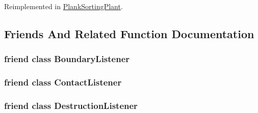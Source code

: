 Reimplemented in \hyperlink{classPlankSortingPlant_a512555c258c6e6d824356af6ed2e77f2}{Plank\-Sorting\-Plant}.



\subsection{Friends And Related Function Documentation}
\hypertarget{classSimulatorPage_ace42de2cf55b34c2abc668b911b4fc70}{
\subsubsection[{Boundary\-Listener}]{\setlength{\rightskip}{0pt plus 5cm}friend class Boundary\-Listener\hspace{0.3cm}{\ttfamily [friend]}}}\label{classSimulatorPage_ace42de2cf55b34c2abc668b911b4fc70}
\hypertarget{classSimulatorPage_aea5531aaede6e9afc2c156b067c847d4}{
\subsubsection[{Contact\-Listener}]{\setlength{\rightskip}{0pt plus 5cm}friend class Contact\-Listener\hspace{0.3cm}{\ttfamily [friend]}}}\label{classSimulatorPage_aea5531aaede6e9afc2c156b067c847d4}
\hypertarget{classSimulatorPage_a070117113adbe4bd234cc819a8a31d67}{
\subsubsection[{Destruction\-Listener}]{\setlength{\rightskip}{0pt plus 5cm}friend class {\bf Destruction\-Listener}\hspace{0.3cm}{\ttfamily [friend]}}}\label{classSimulatorPage_a070117113adbe4bd234cc819a8a31d67}


